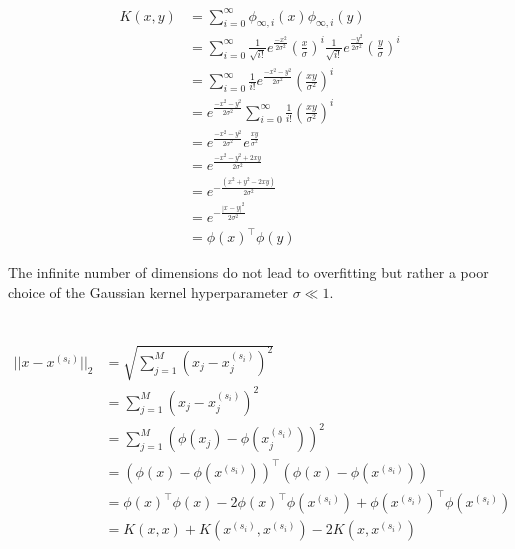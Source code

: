 \documentclass[11pt]{article}
\newcommand{\exercise}{\section{}}
\newcommand{\sumf}[3]{\sum_{#1}^{#2} #3}
\newcommand{\tf}[1]{{#1}^{\intercal}}
\begin{document}
\begin{align*}
K(x, y) &= \sumf{i=0}{\infty}{ \phi_{\infty, i}(x) \phi_{\infty, i}(y) } \\
&= \sumf{i=0}{ \infty }{ \frac{1}{ \sqrt{i!} } e^{ \frac{ -x^2 }{ 2\sigma^2 } } ( \frac{ x }{ \sigma } )^i  \frac{1}{ \sqrt{i!} } e^{ \frac{ -y^2 }{ 2\sigma^2 } } ( \frac{ y }{ \sigma } )^i} \\
&= \sumf{i=0}{ \infty }{ \frac{1}{ i! } e^{ \frac{ -x^2 -y^2 }{ 2\sigma^2 } } ( \frac{ x y }{ \sigma^2 } )^i } \\
&= e^{ \frac{ -x^2 -y^2 }{ 2\sigma^2 } } \sumf{i=0}{ \infty }{ \frac{1}{ i! }  ( \frac{ x y }{ \sigma^2 } )^i } \tag{by Taylor series of $e^z$} \\
&= e^{ \frac{ -x^2 -y^2 }{ 2\sigma^2 } } e^{ \frac{ x y }{ \sigma^2 } } \\
&= e^{ \frac{ -x^2 -y^2  + 2xy }{ 2\sigma^2 } }  \\
&= e^{ - \frac{ (x^2 + y^2  - 2xy) }{ 2\sigma^2 } }  \\
&= e^{ - \frac{ | x - y |^2 }{ 2\sigma^2 } }  \tag{by definition Gaussian Kernel } \\
&= \tf{\phi(x)} \phi(y)
\end{align*}

The infinite number of dimensions do not lead to overfitting but rather a poor choice of the Gaussian kernel hyperparameter $\sigma  \ll 1$.

\exercise

\exercise

\begin{align*}
|| x - x^{(s_i)} ||_2 &= \sqrt{\sumf{j = 1}{M}{(x_j - x_j^{(s_i)})^2}} \\
&= \sumf{j = 1}{M}{(x_j - x_j^{(s_i)})^2} \tag{squared distance does not change k nearest neighbors of $x$} \\
&= \sumf{j = 1}{M}{(\phi(x_j) - \phi(x_j^{(s_i)}))^2} \tag{ by feature map $\phi(x)$ } \\
&= \tf{(\phi(x) - \phi(x^{(s_i)}))} (\phi(x) - \phi(x^{(s_i)})) \\
&= \tf{\phi(x)} \phi(x) - 2 \tf{ \phi(x) }  \phi(x^{(s_i)}) + \tf{ \phi(x^{(s_i)}) }  \phi(x^{(s_i)}) \\
&= K(x, x)  + K(x^{(s_i)}, x^{(s_i)}) - 2 K(x, x^{(s_i)})
\end{align*}
\end{document}
